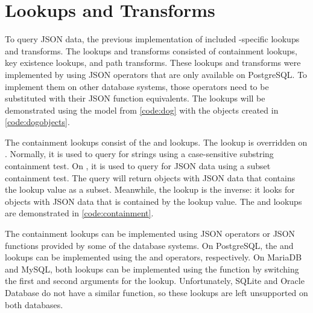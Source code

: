 \section{ Lookups and Transforms}

To query JSON data, the previous implementation of  included
-specific lookups and transforms. The lookups and transforms
consisted of containment lookups, key existence lookups, and path transforms.
These lookups and transforms were implemented by using JSON operators that are
only available on PostgreSQL. To implement them on other database systems,
those operators need to be substituted with their JSON function equivalents.
The lookups will be demonstrated using the  model from
\autoref{code:dog} with the objects created in \autoref{code:dogobjects}.

\noindent
\begin{minipage}{\linewidth}

\end{minipage}

\noindent
\begin{minipage}{\linewidth}

\end{minipage}

The containment lookups consist of the  and 
lookups. The  lookup is overridden on .
Normally, it is used to query for strings using a case-sensitive substring
containment test. On , it is used to query for JSON data using
a subset containment test. The query will return objects with JSON data that
contains the lookup value as a subset. Meanwhile, the 
lookup is the inverse: it looks for objects with JSON data that is contained by
the lookup value. The  and  lookups are
demonstrated in \autoref{code:containment}.

The containment lookups can be implemented using JSON operators or JSON
functions provided by some of the database systems. On PostgreSQL, the
 and  lookups can be implemented using the
 and  operators, respectively. On MariaDB and MySQL, both
lookups can be implemented using the  function by
switching the first and second arguments for the  lookup.
Unfortunately, SQLite and Oracle Database do not have a similar function, so
these lookups are left unsupported on both databases.

